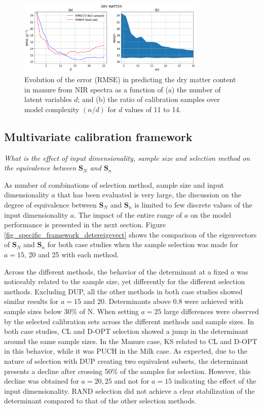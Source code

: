 \documentclass[journal=ancham,manuscript=article]{achemso}
\begin{document}
\begin{figure}[b]
\includegraphics[width=0.8\textwidth]{manuscript/figures/d02_manure_general_framework.png}
\centering
\caption{Evolution of the error (RMSE) in predicting the dry matter content in manure from NIR spectra as a function of (a) the number of latent variables $d$; and (b) the ratio of calibration samples over model complexity $(n/d)$ for $d$ values of 11 to 14.}
\label{fig_d02_manure_general_framework}
\end{figure}

\subsection*{Multivariate calibration framework}\label{results:specframework}

\emph{What is the effect of input dimensionality, sample size and selection method on the equivalence between $\mathbf{S}_N$ and $\mathbf{S}_n$} 

As number of combinations of selection method, sample size and input dimensionality $a$ that has been evaluated is very large, the discussion on the degree of equivalence between $\mathbf{S}_N$ and $\mathbf{S}_n$ is limited to few discrete values of the input dimensionality $a$. The impact of the entire range of $a$ on the model performance is presented in the next section. Figure \ref{fig_specific_framework_detereigevect} shows the comparison of the eigenvectors of $\mathbf{S}_N$ and $\mathbf{S}_n$ for both case studies when the sample selection was made for $a=15$, 20 and 25 with each method. 

Across the different methods, the behavior of the determinant at a fixed $a$ was noticeably related to the sample size, yet differently for the different selection methods. Excluding DUP, all the other methods in both case studies showed similar results for $a=15$ and 20. Determinants above 0.8 were achieved with sample sizes below 30\% of N. When setting $a=25$ large differences were observed by the selected calibration sets across the different methods and sample sizes. In both case studies, CL and D-OPT selection showed a jump in the determinant around the same sample sizes. In the Manure case, KS related to CL and D-OPT in this behavior, while it was PUCH in the Milk case. As expected, due to the nature of selection with DUP creating two equivalent subsets, the determinant presents a decline after crossing 50\% of the samples for selection. However, this decline was obtained for $a=20, 25$ and not for $a=15$ indicating the effect of the input dimensionality. RAND selection did not achieve a clear stabilization of the determinant compared to that of the other selection methods.
\end{document}
